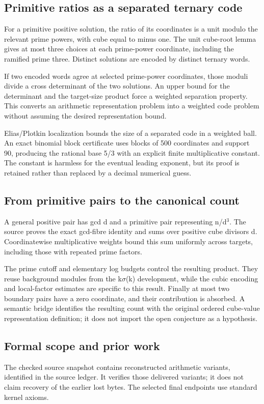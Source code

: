 \documentclass[11pt,a4paper]{article}
\begin{document}
\subsection{Primitive ratios as a separated ternary code}
For a primitive positive solution, the ratio of its coordinates is a unit modulo the relevant prime powers, with cube equal to minus one. The unit cube-root lemma gives at most three choices at each prime-power coordinate, including the ramified prime three. Distinct solutions are encoded by distinct ternary words.

If two encoded words agree at selected prime-power coordinates, those moduli divide a cross determinant of the two solutions. An upper bound for the determinant and the target-size product force a weighted separation property. This converts an arithmetic representation problem into a weighted code problem without assuming the desired representation bound.

Elias/Plotkin localization bounds the size of a separated code in a weighted ball. An exact binomial block certificate uses blocks of 500 coordinates and support 90, producing the rational base 5/3 with an explicit finite multiplicative constant. The constant is harmless for the eventual leading exponent, but its proof is retained rather than replaced by a decimal numerical guess.

\subsection{From primitive pairs to the canonical count}
A general positive pair has gcd d and a primitive pair representing n/d\ensuremath{^3}. The source proves the exact gcd-fibre identity and sums over positive cube divisors d. Coordinatewise multiplicative weights bound this sum uniformly across targets, including those with repeated prime factors.

The prime cutoff and elementary log budgets control the resulting product. They reuse background modules from the k\ensuremath{\sigma}(k) development, while the cubic encoding and local-factor estimates are specific to this result. Finally at most two boundary pairs have a zero coordinate, and their contribution is absorbed. A semantic bridge identifies the resulting count with the original ordered cube-value representation definition; it does not import the open conjecture as a hypothesis.

\subsection{Formal scope and prior work}
The checked source snapshot contains reconstructed arithmetic variants, identified in the source ledger. It verifies those delivered variants; it does not claim recovery of the earlier lost bytes. The selected final endpoints use standard kernel axioms.
\end{document}
